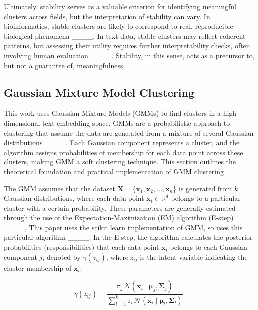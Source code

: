 Ultimately, stability serves as a valuable criterion for identifying meaningful clusters across fields, but the interpretation of stability can vary. In bioinformatics, stable clusters are likely to correspond to real, reproducible biological phenomena ____. In text data, stable clusters may reflect coherent patterns, but assessing their utility requires further interpretability checks, often involving human evaluation ____. Stability, in this sense, acts as a precursor to, but not a guarantee of, meaningfulness ____.




\subsection*{Gaussian Mixture Model Clustering}

This work uses Gaussian Mixture Models (GMMs) to find clusters in a high dimensional text embedding space.  GMMs are a probabilistic approach to clustering that assume the data are generated from a mixture of several Gaussian distributions ____. Each Gaussian component represents a cluster, and the algorithm assigns probabilities of membership for each data point across these clusters, making GMM a soft clustering technique. This section outlines the theoretical foundation and practical implementation of GMM clustering ____.


The GMM assumes that the dataset $\mathbf{X} = \{\mathbf{x}_1, \mathbf{x}_2, \dots, \mathbf{x}_n\}$ is generated from $k$ Gaussian distributions, where each data point $\mathbf{x}_i \in \mathbb{R}^d$ belongs to a particular cluster with a certain probability.  These parameters are generally estimated through the use of the Expectation-Maximization (EM) algorithm (E-step) ____, This paper uses the scikit learn implementation of GMM, so uses this particular algorithm ____. In the E-step, the algorithm calculates the posterior probabilities (responsibilities) that each data point $\mathbf{x}_i$ belongs to each Gaussian component $j$, denoted by $\gamma(z_{ij})$, where $z_{ij}$ is the latent variable indicating the cluster membership of $\mathbf{x}_i$:

\begin{equation}
\gamma(z_{ij}) = \frac{\pi_j \, \mathcal{N}(\mathbf{x}_i \mid \boldsymbol{\mu}_j, \boldsymbol{\Sigma}_j)}{\sum_{l=1}^{k} \pi_l \, \mathcal{N}(\mathbf{x}_i \mid \boldsymbol{\mu}_l, \boldsymbol{\Sigma}_l)}.
\label{eq:e-step}
\end{equation}

